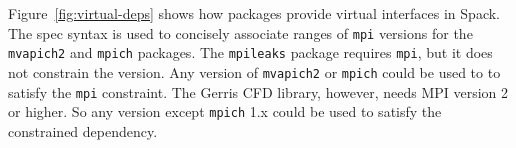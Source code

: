 Figure~\ref{fig:virtual-deps} shows how packages provide
virtual interfaces in Spack.  The spec syntax is used to concisely
associate ranges of {\tt mpi} versions for the {\tt mvapich2} and {\tt mpich} packages.
The {\tt mpileaks} package requires {\tt mpi}, but it does not constrain the version.
Any version of {\tt mvapich2} or {\tt mpich} could be used to to satisfy the {\tt mpi}
constraint. The Gerris CFD library, however, needs MPI version 2 or higher.  So any
version except {\tt mpich} 1.x could be used to satisfy the constrained dependency.





